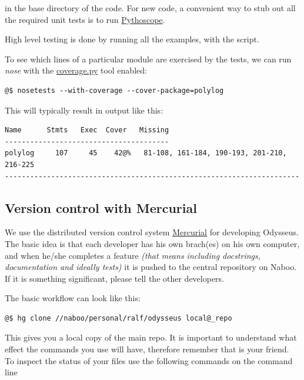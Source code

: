 \documentclass[letterpaper,10pt,english]{manual}
\begin{document}
in the base directory of the code. For new code, a convenient way to stub out all the required unit tests is to run \href{http://pythoscope.org/}{Pythoscope}.

High level testing is done by running all the examples, with the  script.

To see which lines of a particular module are exercised by the tests, we can run \emph{nose} with the \href{http://somethingaboutorange.com/mrl/projects/nose/}{coverage.py} tool enabled:

\begin{Verbatim}[commandchars=@\[\]]
@$ nosetests --with-coverage --cover-package=polylog
\end{Verbatim}

This will typically result in output like this:

\begin{Verbatim}[commandchars=@\[\]]
Name      Stmts   Exec  Cover   Missing
---------------------------------------
polylog     107     45    42@%   81-108, 161-184, 190-193, 201-210, 216-225
----------------------------------------------------------------------
\end{Verbatim}


\subsection{Version control with Mercurial}

We use the distributed version control system \href{http://www.selenic.com/mercurial/wiki/}{Mercurial} for developing Odysseus. The basic idea is that each developer has his own brach(es) on his own computer, and when he/she completes a feature \emph{(that means including docstrings, documentation and ideally tests)} it is pushed to the central repository on Naboo. If it is something significant, please tell the other developers.

The basic workflow can look like this:

\begin{Verbatim}[commandchars=@\[\]]
@$ hg clone //naboo/personal/ralf/odysseus local@_repo
\end{Verbatim}

This gives you a local copy of the main repo. It is important to understand what effect the commands you use will have, therefore remember that  is your friend. To inspect the status of your files use the following commands on the command line
\end{document}
